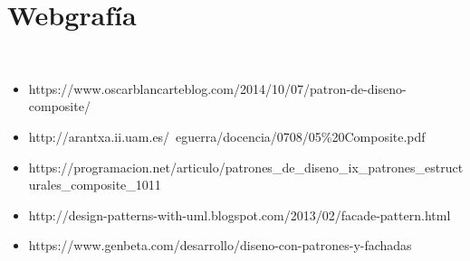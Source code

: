 \section{Webgrafía} 
\textbf{}\\
\begin{flushleft}

\begin{itemize}
	\item https://www.oscarblancarteblog.com/2014/10/07/patron-de-diseno-composite/
	\item http://arantxa.ii.uam.es/~eguerra/docencia/0708/05\%20Composite.pdf
	\item https://programacion.net/articulo/patrones\_de\_diseno\_ix\_patrones\_estructurales\_composite\_1011
          \item http://design-patterns-with-uml.blogspot.com/2013/02/facade-pattern.html
          \item https://www.genbeta.com/desarrollo/diseno-con-patrones-y-fachadas
	
	

\end{itemize} 


\end{flushleft}
